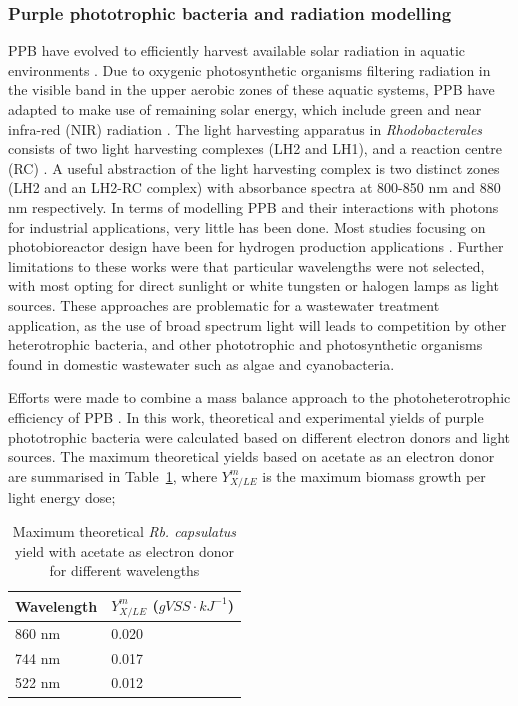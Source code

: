 \subsubsection{Purple phototrophic bacteria and radiation modelling}
PPB have evolved to efficiently harvest available solar radiation in aquatic environments \cite{cogdell2006}. Due to oxygenic photosynthetic organisms filtering radiation in the visible band in the upper aerobic zones of these aquatic systems, PPB have adapted to make use of remaining solar energy, which include green and near infra-red (NIR) radiation \cite{cogdell2006}. The light harvesting apparatus in \textit{Rhodobacterales} consists of two light harvesting complexes (LH2 and LH1), and a reaction centre (RC) \cite{hellingwerf1994}. A useful abstraction of the light harvesting complex is two distinct zones (LH2 and an LH2-RC complex) with absorbance spectra at 800-850 \si{nm} and 880 \si{nm} respectively. %
\skippingparagraph
In terms of modelling PPB and their interactions with photons for industrial applications, very little has been done. Most studies focusing on photobioreactor design have been for hydrogen production applications \cite{adessi2014, krujatz2015}. Further limitations to these works were that particular wavelengths were not selected, with most opting for direct sunlight or white tungsten or halogen lamps as light sources. These approaches are problematic for a wastewater treatment application, as the use of broad spectrum light will leads to competition by other heterotrophic bacteria, and other phototrophic and photosynthetic organisms found in domestic wastewater such as algae and cyanobacteria.
\skippingparagraph

Efforts were made to combine a mass balance approach to the photoheterotrophic efficiency of PPB \cite{minkevich2004}. In this work, theoretical and experimental yields of purple phototrophic bacteria were calculated based on different electron donors and light sources. The maximum theoretical yields based on acetate as an electron donor are summarised in Table~\ref{tab:theoreticalQuantum}, where $Y^m_{X/LE}$ is the maximum biomass growth per light energy dose;

\begin{table}[H]
  \begin{center}
    \caption{Maximum theoretical \textit{Rb. capsulatus} yield with
      acetate as electron donor for different wavelengths
      \cite{minkevich2004}}
    \label{tab:theoreticalQuantum}
    \begin{tabular}{ | l | l |}
      \hline
      Wavelength& $Y^m_{X/LE}$ ($gVSS\cdot kJ^{-1}$)\\ \hline \hline
      860 nm & 0.020 \\ \hline
      744 nm & 0.017  \\ \hline
      522 nm & 0.012  \\ \hline
    \end{tabular}
  \end{center}
\end{table}

